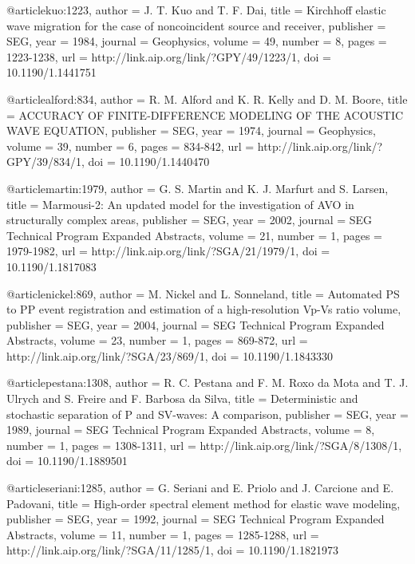 {@article{kuo:1223,
  author =	 {J. T. Kuo and T. F. Dai},
  title =	 {Kirchhoff elastic wave migration for the case of
                  noncoincident source and receiver},
  publisher =	 {SEG},
  year =	 1984,
  journal =	 {Geophysics},
  volume =	 49,
  number =	 8,
  pages =	 {1223-1238},
  url =		 {http://link.aip.org/link/?GPY/49/1223/1},
  doi =		 {10.1190/1.1441751}
}

@article{alford:834,
  author =	 {R. M. Alford and K. R. Kelly and D. M. Boore},
  title =	 {ACCURACY OF FINITE-DIFFERENCE MODELING OF THE
                  ACOUSTIC WAVE EQUATION},
  publisher =	 {SEG},
  year =	 1974,
  journal =	 {Geophysics},
  volume =	 39,
  number =	 6,
  pages =	 {834-842},
  url =		 {http://link.aip.org/link/?GPY/39/834/1},
  doi =		 {10.1190/1.1440470}
}

@article{martin:1979,
  author =	 {G. S. Martin and K. J. Marfurt and S. Larsen},
  title =	 {Marmousi-2: An updated model for the investigation
                  of AVO in structurally complex areas},
  publisher =	 {SEG},
  year =	 2002,
  journal =	 {SEG Technical Program Expanded Abstracts},
  volume =	 21,
  number =	 1,
  pages =	 {1979-1982},
  url =		 {http://link.aip.org/link/?SGA/21/1979/1},
  doi =		 {10.1190/1.1817083}
}

@article{nickel:869,
  author =	 {M. Nickel and L. Sonneland},
  title =	 {Automated {PS} to {PP} event registration and
                  estimation of a high-resolution {V}p-{V}s ratio
                  volume},
  publisher =	 {SEG},
  year =	 2004,
  journal =	 {SEG Technical Program Expanded Abstracts},
  volume =	 23,
  number =	 1,
  pages =	 {869-872},
  url =		 {http://link.aip.org/link/?SGA/23/869/1},
  doi =		 {10.1190/1.1843330}
}

@article{pestana:1308,
  author =	 {R. C. Pestana and F. M. Roxo da Mota and
                  T. J. Ulrych and S. Freire and F. Barbosa
                  da Silva},
  title =	 {Deterministic and stochastic separation of {P} and
                  {SV}-waves: A comparison},
  publisher =	 {SEG},
  year =	 1989,
  journal =	 {SEG Technical Program Expanded Abstracts},
  volume =	 8,
  number =	 1,
  pages =	 {1308-1311},
  url =		 {http://link.aip.org/link/?SGA/8/1308/1},
  doi =		 {10.1190/1.1889501}
}

@article{seriani:1285,
  author =	 {G. Seriani and E. Priolo and J. Carcione and
                  E. Padovani},
  title =	 {High-order spectral element method for elastic wave
                  modeling},
  publisher =	 {SEG},
  year =	 1992,
  journal =	 {SEG Technical Program Expanded Abstracts},
  volume =	 11,
  number =	 1,
  pages =	 {1285-1288},
  url =		 {http://link.aip.org/link/?SGA/11/1285/1},
  doi =		 {10.1190/1.1821973}
}

}
